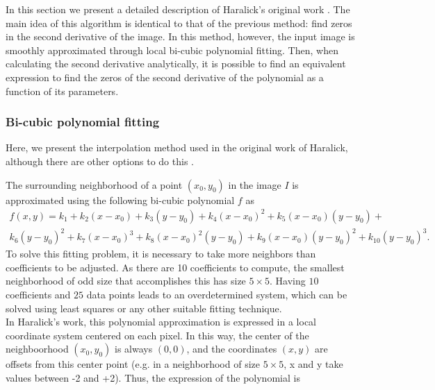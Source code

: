 \documentclass{ipol}
\numberwithin{equation}{section}
\numberwithin{table}{section}
\begin{document}
In this section we present a detailed description of Haralick's original work \cite{bb20239}.
The main idea of this algorithm is identical to that of the previous method: find zeros in 
the second derivative of the image. In this method, however, the input image is smoothly approximated through local bi-cubic
polynomial fitting. Then, when calculating the second derivative analytically, it is possible to find 
an equivalent expression to find the zeros of the second derivative of the polynomial as a function of 
its parameters.%


\subsubsection{Bi-cubic polynomial fitting}
\label{sec:bicubic}

Here, we present the interpolation method used in the original work of Haralick, although there are other options to do this \cite{getreuer}. 

The surrounding neighborhood of a point $(x_0,y_0)$ in the image $I$ is approximated using the following bi-cubic polynomial $f$ as
\begin{align}
	\label{eq:bicubic:long}
	f(x,y) = k_1 + k_2 (x-x_0) + k_3(y-y_0) + k_4(x-x_0)^2 + k_5(x-x_0)(y-y_0)  + \nonumber\\
	 k_6(y-y_0) ^2 + k_7(x-x_0)^3 + k_8(x-x_0)^2(y-y_0)  + k_9(x-x_0)(y-y_0) ^2 + k_{10}(y-y_0) ^3.
\end{align}
To solve this fitting problem, it is necessary to take more neighbors than coefficients to be adjusted. As there are 10 coefficients to compute, the smallest neighborhood of odd size that accomplishes this has size $5\times5$. Having $10$ coefficients and $25$ data 
points leads to an overdetermined system, which can be solved using least squares or any other suitable fitting technique.\\

In Haralick's work, this polynomial approximation is expressed in a local coordinate system centered on each pixel. In this way, the center of the neighboorhood $(x_0,y_0)$ is always $(0,0)$, and the coordinates $(x, y)$ are offsets from this center point (e.g. in a neighborhood of size $5\times5$, x and y take values between -2 and +2). Thus, the expression of the polynomial is\\
\end{document}
